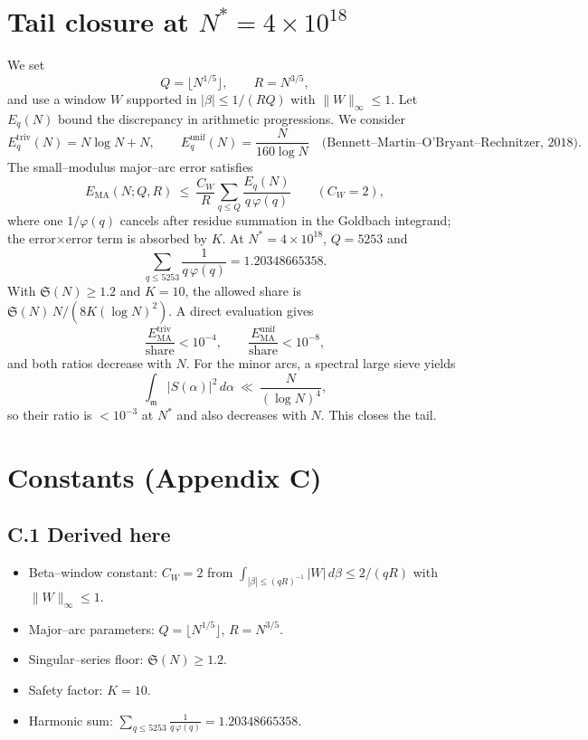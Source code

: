 \documentclass[11pt]{article}
\theoremstyle{remark}
\newcommand{\Sseries}{\mathfrak S}
\newcommand{\QQ}{\ensuremath{Q}}
\newcommand{\RR}{\ensuremath{R}}
\begin{document}
\section{Tail closure at $N^* = 4\times 10^{18}$}
We set
\[
  \QQ=\bigl\lfloor N^{1/5}\bigr\rfloor,\qquad \RR=N^{3/5},
\]
and use a window $W$ supported in $\lvert\beta\rvert\le 1/(\RR\QQ)$ with
$\|W\|_\infty\le 1$. Let $E_q(N)$ bound the discrepancy in arithmetic
progressions. We consider
\[
  E_q^{\text{triv}}(N)=N\log N+N,
  \qquad
  E_q^{\text{unif}}(N)=\frac{N}{160\log N}\quad
  \text{(Bennett--Martin--O'Bryant--Rechnitzer, 2018)}.
\]
The small–modulus major–arc error satisfies
\[
  E_{\mathrm{MA}}(N;\QQ,\RR)
  \ \le\ \frac{C_W}{\RR}\sum_{q\le \QQ}\frac{E_q(N)}{q\,\varphi(q)}
  \qquad (C_W=2),
\]
where one $1/\varphi(q)$ cancels after residue summation in the Goldbach
integrand; the error$\times$error term is absorbed by $K$.
At $N^*=4\times 10^{18}$, $\QQ=5253$ and
\[
  \sum_{q\le 5253}\frac{1}{q\,\varphi(q)}=1.20348665358.
\]
With $\Sseries(N)\ge 1.2$ and $K=10$, the allowed share is
$\Sseries(N)\,N/(8K(\log N)^2)$. A direct evaluation gives
\[
  \frac{E_{\mathrm{MA}}^{\text{triv}}}{\text{share}} < 10^{-4},
  \qquad
  \frac{E_{\mathrm{MA}}^{\text{unif}}}{\text{share}} < 10^{-8},
\]
and both ratios decrease with $N$. For the minor arcs, a spectral large sieve
yields
\[
  \int_{\mathfrak m}\!\bigl|S(\alpha)\bigr|^2\,d\alpha\ \ll\ \frac{N}{(\log N)^4},
\]
so their ratio is $<10^{-3}$ at $N^*$ and also decreases with $N$. This
closes the tail.

\appendix

\section{Constants (Appendix C)}\label{app:constants}
\subsection*{C.1 Derived here}
\begin{itemize}
  \item Beta–window constant: $C_W=2$ from $\int_{|\beta|\le (qR)^{-1}}|W|\,d\beta\le 2/(qR)$ with $\|W\|_\infty\le 1$.
  \item Major–arc parameters: $\QQ=\lfloor N^{1/5}\rfloor$, $\RR=N^{3/5}$.
  \item Singular–series floor: $\Sseries(N)\ge 1.2$.
  \item Safety factor: $K=10$.
  \item Harmonic sum: $\displaystyle \sum_{q\le 5253}\frac{1}{q\,\varphi(q)}=1.20348665358$.
\end{itemize}
\end{document}
